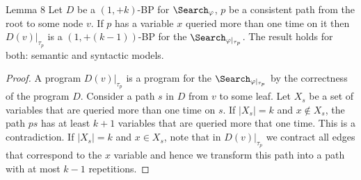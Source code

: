 \begin{result}{Lemma 8}
Let $D$ be a $(1,+k)$-BP for $\Search_\varphi$, $p$ be a consistent path from the root to some node $v$. If $p$ has a variable $x$ queried more than one time on it then $D(v)|_{\tau_p}$ is a $(1,+(k-1))$-BP for the $\Search_{\varphi|_{\tau_p}}$. The result holds for both: semantic and syntactic models.
\end{result}
\begin{proof}
A program $D(v)|_{\tau_p}$ is a program for the $\Search_{\varphi|_{\tau_p}}$ by the correctness of the program $D$. Consider a path $s$ in $D$ from $v$ to some leaf. Let $X_s$ be a set of variables that are queried more than one time on $s$. If $|X_s|=k$ and $x\notin X_s$, the path $ps$ has at least $k+1$ variables that are queried more that one time. This is a contradiction. If $|X_s|=k$ and $x\in X_s$, note that in $D(v)|_{\tau_p}$ we contract all edges that correspond to the $x$ variable and hence we transform this path into a path with at most $k-1$ repetitions.
\end{proof}
